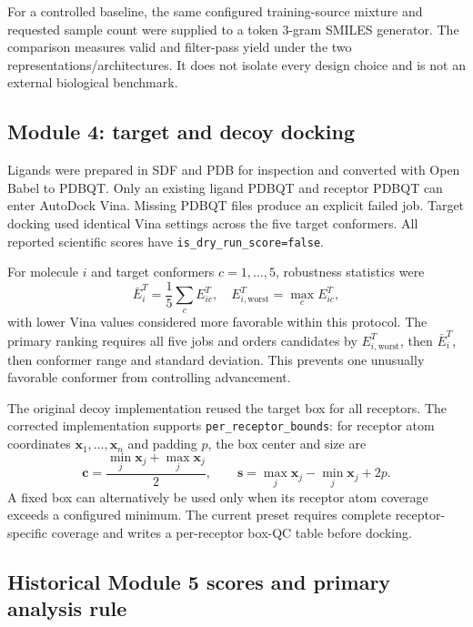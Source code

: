 \documentclass[journal]{IEEEtran}
\begin{document}
For a controlled baseline, the same configured training-source mixture
and requested sample count were supplied to a token 3-gram SMILES
generator. The comparison measures valid and filter-pass yield under
the two representations/architectures. It does not isolate every design
choice and is not an external biological benchmark.

\subsection{Module 4: target and decoy docking}

Ligands were prepared in SDF and PDB for inspection and converted with
Open Babel to PDBQT. Only an existing ligand PDBQT and receptor PDBQT
can enter AutoDock Vina. Missing PDBQT files produce an explicit failed
job. Target docking used identical Vina settings across the five target
conformers. All reported scientific scores have
\texttt{is\_dry\_run\_score=false}.

For molecule $i$ and target conformers $c=1,\ldots,5$, robustness
statistics were
\begin{equation}
 \bar E_i^T=\frac{1}{5}\sum_c E_{ic}^T, \quad
 E_{i,\mathrm{worst}}^T=\max_c E_{ic}^T,
\end{equation}
with lower Vina values considered more favorable within this protocol.
The primary ranking requires all five jobs and orders candidates by
$E_{i,\mathrm{worst}}^T$, then $\bar E_i^T$, then conformer range and
standard deviation. This prevents one unusually favorable conformer
from controlling advancement.

The original decoy implementation reused the target box for all
receptors. The corrected implementation supports
\texttt{per\_receptor\_bounds}: for receptor atom coordinates
$\mathbf{x}_{1},\ldots,\mathbf{x}_{n}$ and padding $p$, the box center
and size are
\begin{equation}
 \mathbf{c}=\frac{\min_j\mathbf{x}_j+\max_j\mathbf{x}_j}{2},\qquad
 \mathbf{s}=\max_j\mathbf{x}_j-\min_j\mathbf{x}_j+2p.
\end{equation}
A fixed box can alternatively be used only when its receptor atom
coverage exceeds a configured minimum. The current preset requires
complete receptor-specific coverage and writes a per-receptor box-QC
table before docking.

\subsection{Historical Module 5 scores and primary analysis rule}
\end{document}
